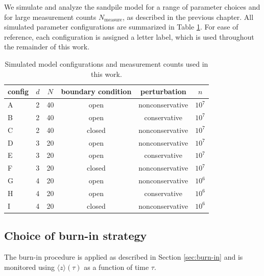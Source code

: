 We simulate and analyze the sandpile model for a range of parameter choices and for large measurement counts $N_{\text{measure}}$, as described in the previous chapter. All simulated parameter configurations are summarized in Table \ref{tab:model_configurations}. For ease of reference, each configuration is assigned a letter label, which is used throughout the remainder of this work.

\begin{table}[ht!]
  \centering
  \begin{tabular}{lccccc}
    \hline
    config & $d$ & $N$ & boundary condition & perturbation & $n$ \\
    \hline
    A & 2 & 40 & open   & nonconservative & $10^7$ \\
    B & 2 & 40 & open   & conservative    & $10^7$ \\
    C & 2 & 40 & closed & nonconservative & $10^7$ \\
    D & 3 & 20 & open   & nonconservative & $10^7$ \\
    E & 3 & 20 & open   & conservative    & $10^7$ \\
    F & 3 & 20 & closed & nonconservative & $10^7$ \\
    G & 4 & 20 & open   & nonconservative & $10^6$ \\
    H & 4 & 20 & open   & conservative    & $10^6$ \\
    I & 4 & 20 & closed & nonconservative & $10^6$ \\
    \hline
  \end{tabular}
  \caption{Simulated model configurations and measurement counts used in this work.}
  \label{tab:model_configurations}
\end{table}

\subsection{Choice of burn-in strategy}

The burn-in procedure is applied as described in Section \ref{sec:burn-in} and is monitored using $\langle z\rangle(\tau)$ as a function of time $\tau$.

